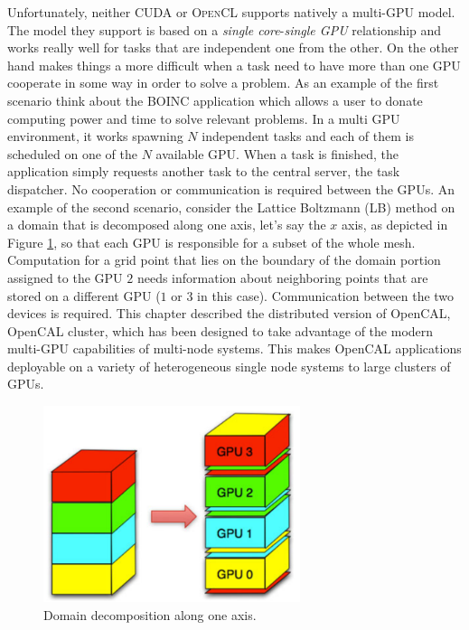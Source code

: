 Unfortunately, neither \textsc{CUDA} or \textsc{OpenCL} supports natively a multi-GPU model. The model they support is based on a \textit{single core}-\textit{single GPU} relationship and works really well for tasks that are independent one from the other.
On the other hand makes things a more difficult when a task need to have more than one GPU cooperate in some way in order to solve a problem.
As an example of the first scenario think about the BOINC application \cite{Anderson:2004} which allows a user to donate computing power and time to solve relevant problems. In a multi GPU environment, it works spawning $N$ independent tasks and each of them is scheduled on one of the $N$ available GPU. When a task is finished, the application simply requests another task to the central server, the task dispatcher. No cooperation or communication is required between the GPUs.
An example of the second scenario, consider the Lattice Boltzmann (LB) \cite{McNamara&Zanetti-1988} \cite{Aidun2010439} \cite{Higuera&Jimenez-1989} method on a domain that is decomposed along one axis, let's say the $x$ axis, as depicted in Figure \ref{fig:multigpu_domain_decomposition}, so that each GPU is responsible for a subset of the whole mesh. Computation for a grid point that lies on the boundary of the domain portion assigned to the GPU $2$ needs information about neighboring points that are stored on a different GPU ($1$ or $3$ in this case). Communication between the two devices is required.
This chapter described the distributed version of OpenCAL, OpenCAL cluster, which has been designed to take advantage of the modern multi-GPU capabilities of multi-node systems. This makes OpenCAL applications deployable on a variety of heterogeneous single node systems to large clusters of GPUs.
  \begin{figure}
	\begin{center}
		\includegraphics[width=0.67\textwidth]{./images/opencal/multigpu_domain_decomposition.png}
		\caption{Domain decomposition along one axis.}
		\label{fig:multigpu_domain_decomposition}
	\end{center}
\end{figure}

